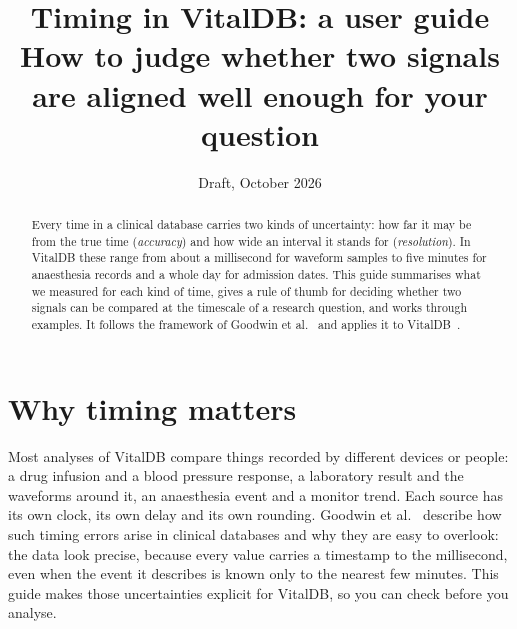 \documentclass[11pt,a4paper]{article}
\title{Timing in VitalDB: a user guide\\[4pt]\large How to judge whether two signals are aligned well enough for your question}
\author{}
\date{Draft, October 2026}
\begin{document}
\maketitle

\begin{abstract}
Every time in a clinical database carries two kinds of uncertainty: how far it may be from the true time
(\emph{accuracy}) and how wide an interval it stands for (\emph{resolution}). In VitalDB these range from about a
millisecond for waveform samples to five minutes for anaesthesia records and a whole day for admission dates. This
guide summarises what we measured for each kind of time, gives a rule of thumb for deciding whether two signals can
be compared at the timescale of a research question, and works through examples. It follows the framework of
Goodwin et al.~\cite{goodwin2022timing} and applies it to VitalDB~\cite{lee2022vitaldb}.
\end{abstract}

\noindent{}

\section{Why timing matters}
Most analyses of VitalDB compare things recorded by different devices or people: a drug infusion and a blood
pressure response, a laboratory result and the waveforms around it, an anaesthesia event and a monitor trend. Each
source has its own clock, its own delay and its own rounding. Goodwin et al.~\cite{goodwin2022timing} describe how
such timing errors arise in clinical databases and why they are easy to overlook: the data look precise, because
every value carries a timestamp to the millisecond, even when the event it describes is known only to the nearest
few minutes. This guide makes those uncertainties explicit for VitalDB, so you can check before you analyse.
\end{document}
